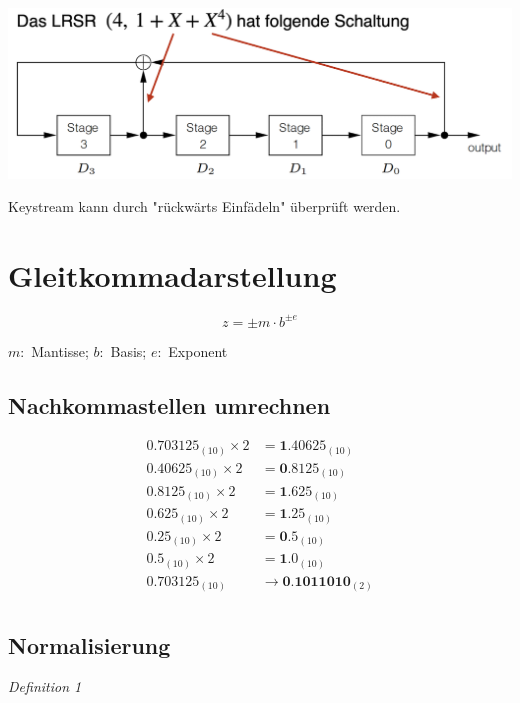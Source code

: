 \documentclass[a4paper,6pt]{article}
\begin{document}
\begin{multicols*}{3}
\begin{center}
    \includegraphics[width=1\linewidth]{resources/LRSR.png}
\end{center}

Keystream kann durch "rückwärts Einfädeln" überprüft werden.

\section{Gleitkommadarstellung}


\begin{equation*}
    z = \pm m \cdot b^{\pm e}
\end{equation*}

$m:$ Mantisse; $b:$ Basis; $e:$ Exponent

\subsection*{Nachkommastellen umrechnen}

\begin{align*}
    0.703125_{(10)} \times 2 &= \textbf{1}.40625_{(10)} \\
    0.40625_{(10)} \times 2 &= \textbf{0}.8125_{(10)} \\
    0.8125_{(10)} \times 2 &= \textbf{1}.625_{(10)} \\
    0.625_{(10)} \times 2 &= \textbf{1}.25_{(10)} \\
    0.25_{(10)} \times 2 &= \textbf{0}.5_{(10)} \\
    0.5_{(10)} \times 2 &= \textbf{1}.0_{(10)} \\
    0.703125_{(10)} &\rightarrow \textbf{0.1011010}_{(2)} \\
\end{align*}


\subsection*{Normalisierung}

\textit{Definition 1}


\end{multicols*}
\end{document}
